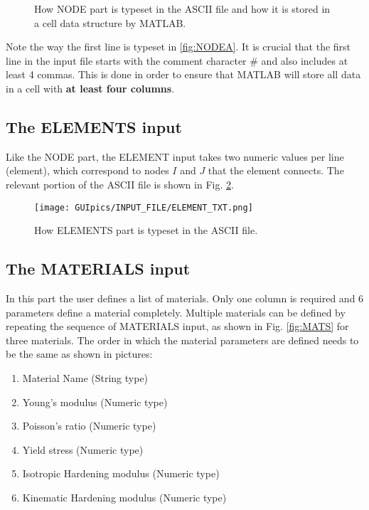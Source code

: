 \begin{appendices}
\begin{figure}
	\centering
	
	
	\caption{How NODE part is typeset in the ASCII file and how it is stored in 
		a cell data structure by MATLAB.}
	\label{fig:NODE}
\end{figure}

Note the way the first line is typeset in \ref{fig:NODEA}. It is crucial  that 
the first line in the input file starts with the comment character $\#$ and 
also includes at least 4 commas. This is done in order to ensure that MATLAB 
will store all data in a cell with \textbf{at least four columns}.

\subsection*{The ELEMENTS input}
Like the NODE part, the ELEMENT input takes two numeric values per line 
(element), which correspond to nodes $I$ and $J$ that the element connects. The 
relevant portion of the ASCII file is shown in Fig. \ref{fig:ELEMENTS}.

\begin{figure}
	\centering
	\texttt{[image: GUIpics/INPUT\_FILE/ELEMENT\_TXT.png]}
	\caption{How ELEMENTS part is typeset in the ASCII file.}
	\label{fig:ELEMENTS}
\end{figure}

\subsection*{The MATERIALS input}
In this part the user defines a list of materials. Only one column is required 
and 6 parameters define a material completely. Multiple materials can be 
defined by repeating the sequence of MATERIALS input, as shown in Fig. 
\ref{fig:MATS} for three materials. The order in which the material parameters 
are defined needs to be the same as shown in pictures: 
\begin{enumerate}
	\item Material Name (String type)
	\item Young's modulus (Numeric type)
	\item Poisson's ratio (Numeric type)
	\item Yield stress (Numeric type)
	\item Isotropic Hardening modulus (Numeric type)
	\item Kinematic Hardening modulus (Numeric type)
\end{enumerate}


\end{appendices}
